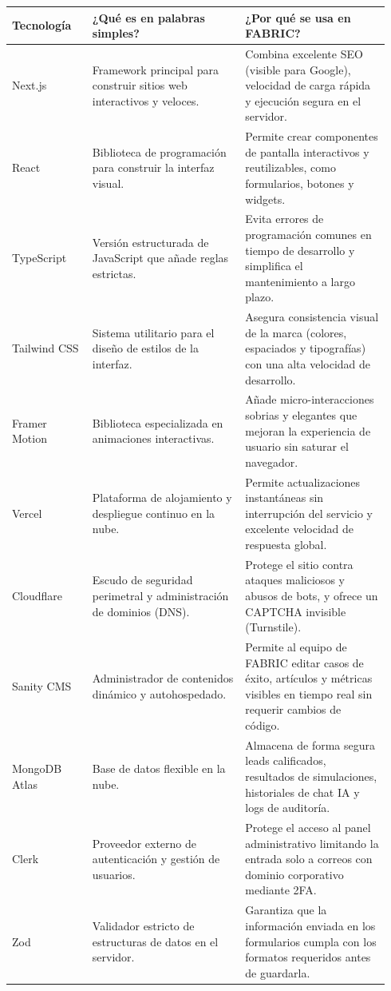 \documentclass[11pt,letterpaper]{article}
\begin{document}
\begin{longtable}{p{0.20\linewidth}p{0.38\linewidth}p{0.36\linewidth}}
\toprule
\textbf{Tecnología} & \textbf{¿Qué es en palabras simples?} & \textbf{¿Por qué se usa en FABRIC?} \\
\midrule
Next.js & Framework principal para construir sitios web interactivos y veloces. & Combina excelente SEO (visible para Google), velocidad de carga rápida y ejecución segura en el servidor. \\
React & Biblioteca de programación para construir la interfaz visual. & Permite crear componentes de pantalla interactivos y reutilizables, como formularios, botones y widgets. \\
TypeScript & Versión estructurada de JavaScript que añade reglas estrictas. & Evita errores de programación comunes en tiempo de desarrollo y simplifica el mantenimiento a largo plazo. \\
Tailwind CSS & Sistema utilitario para el diseño de estilos de la interfaz. & Asegura consistencia visual de la marca (colores, espaciados y tipografías) con una alta velocidad de desarrollo. \\
Framer Motion & Biblioteca especializada en animaciones interactivas. & Añade micro-interacciones sobrias y elegantes que mejoran la experiencia de usuario sin saturar el navegador. \\
Vercel & Plataforma de alojamiento y despliegue continuo en la nube. & Permite actualizaciones instantáneas sin interrupción del servicio y excelente velocidad de respuesta global. \\
Cloudflare & Escudo de seguridad perimetral y administración de dominios (DNS). & Protege el sitio contra ataques maliciosos y abusos de bots, y ofrece un CAPTCHA invisible (Turnstile). \\
Sanity CMS & Administrador de contenidos dinámico y autohospedado. & Permite al equipo de FABRIC editar casos de éxito, artículos y métricas visibles en tiempo real sin requerir cambios de código. \\
MongoDB Atlas & Base de datos flexible en la nube. & Almacena de forma segura leads calificados, resultados de simulaciones, historiales de chat IA y logs de auditoría. \\
Clerk & Proveedor externo de autenticación y gestión de usuarios. & Protege el acceso al panel administrativo limitando la entrada solo a correos con dominio corporativo mediante 2FA. \\
Zod & Validador estricto de estructuras de datos en el servidor. & Garantiza que la información enviada en los formularios cumpla con los formatos requeridos antes de guardarla. \\

\end{longtable}
\end{document}
